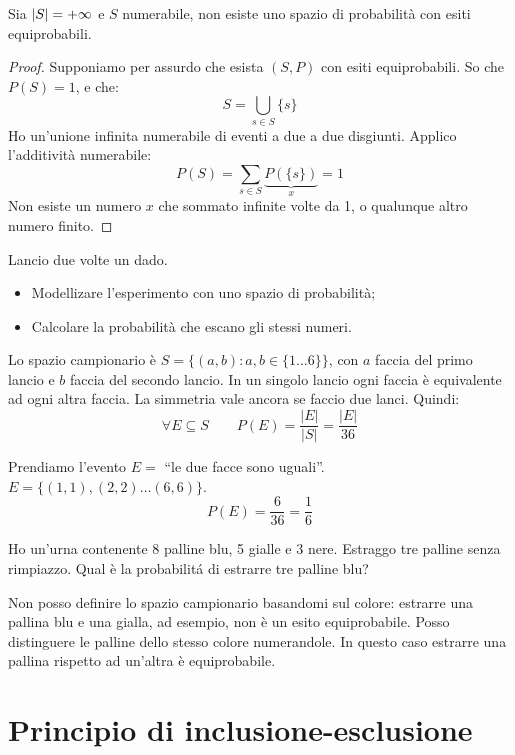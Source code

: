 \begin{prop}
Sia $\left\lvert{S}\right\rvert = + \infty$ e $S$ numerabile, non esiste uno spazio di probabilit\`a con esiti equiprobabili. 
\end{prop}
\begin{proof}
Supponiamo per assurdo che esista $(S,P)$ con esiti equiprobabili. So che $P(S) = 1$, e che:
\[
S = \bigcup_{s \in S} \{s\}
\]
Ho un'unione infinita numerabile di eventi a due a due disgiunti. Applico l'additivit\`a numerabile:
\[
P(S) = \sum_{s \in S} \underbrace{P \left( \{ s \} \right)}_{x} = 1
\]
Non esiste un numero $x$ che sommato infinite volte da 1, o qualunque altro numero finito.
\end{proof}

\begin{esercizio}
Lancio due volte un dado.
\begin{itemize}
    \item Modellizare l'esperimento con uno spazio di probabilit\`a;
    \item Calcolare la probabilit\`a che escano gli stessi numeri.
\end{itemize}
Lo spazio campionario \`e $S = \{ (a,b) : a,b \in \{ 1 \dots 6 \} \}$, con $a$ faccia del primo lancio e $b$ faccia del secondo lancio. In un singolo lancio ogni faccia \`e equivalente ad ogni altra faccia. La simmetria vale ancora se faccio due lanci. Quindi:
\[
\forall  E \subseteq S \qquad P(E) = \frac{|E|}{|S|} = \frac{|E|}{36}
\]

Prendiamo l'evento $E = $ ``le due facce sono uguali''. $E = \{ (1,1), (2,2) \dots (6,6) \}$.
\[
P(E) = \frac{6}{36} = \frac{1}{6}
\]
\end{esercizio}

\begin{esercizio}
Ho un'urna contenente 8 palline blu, 5 gialle e 3 nere. Estraggo tre palline senza rimpiazzo. Qual \`e la probabilit\'a di estrarre tre palline blu?

Non posso definire lo spazio campionario basandomi sul colore: estrarre una pallina blu e una gialla, ad esempio, non \`e un esito equiprobabile. Posso distinguere le palline dello stesso colore numerandole. In questo caso estrarre una pallina rispetto ad un'altra \`e equiprobabile.
\end{esercizio}

\section{Principio di inclusione-esclusione}

